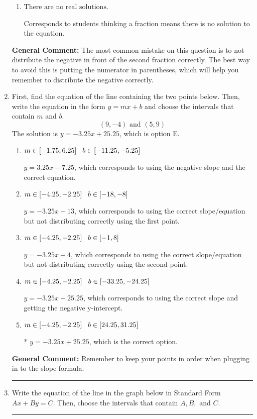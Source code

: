 \documentclass{extbook}[14pt]
\newcommand{\litem}[1]{\item #1

\rule{\textwidth}{0.4pt}}
\begin{document}
\begin{enumerate}
{\begin{enumerate}[label=\Alph*.]
$x = -1.238$, which corresponds to not distributing the negative in front of the second parentheses correctly.
\item \( \text{There are no real solutions.} \)

Corresponds to students thinking a fraction means there is no solution to the equation.
\end{enumerate}

\textbf{General Comment:} The most common mistake on this question is to not distribute the negative in front of the second fraction correctly. The best way to avoid this is putting the numerator in parentheses, which will help you remember to distribute the negative correctly.
}
\litem{
First, find the equation of the line containing the two points below. Then, write the equation in the form $ y=mx+b $ and choose the intervals that contain $m$ and $b$.
\[ (9, -4) \text{ and } (5, 9) \]The solution is \( y = -3.25x + 25.25 \), which is option E.\begin{enumerate}[label=\Alph*.]
\item \( m \in [-1.75, 6.25] \hspace*{3mm} b \in [-11.25, -5.25] \)

 $y = 3.25x -7.25$, which corresponds to using the negative slope and the correct equation.
\item \( m \in [-4.25, -2.25] \hspace*{3mm} b \in [-18, -8] \)

 $y = -3.25x -13$, which corresponds to using the correct slope/equation but not distributing correctly using the first point.
\item \( m \in [-4.25, -2.25] \hspace*{3mm} b \in [-1, 8] \)

 $y = -3.25x + 4$, which corresponds to using the correct slope/equation but not distributing correctly using the second point.
\item \( m \in [-4.25, -2.25] \hspace*{3mm} b \in [-33.25, -24.25] \)

 $y = -3.25x -25.25$, which corresponds to using the correct slope and getting the negative y-intercept.
\item \( m \in [-4.25, -2.25] \hspace*{3mm} b \in [24.25, 31.25] \)

* $y = -3.25x + 25.25$, which is the correct option.
\end{enumerate}

\textbf{General Comment:} Remember to keep your points in order when plugging in to the slope formula.
}
\litem{
Write the equation of the line in the graph below in Standard Form $Ax+By=C$. Then, choose the intervals that contain $A, B, \text{ and } C$.

}
\end{enumerate}
\end{document}
